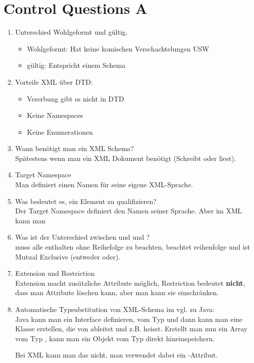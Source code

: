 \section{Control Questions A}
\begin{enumerate}
\item Unterschied Wohlgeformt und gültig.
\begin{itemize}
\item Wohlgeformt: Hat keine komischen Verschachtelungen USW
\item gültig: Entspricht einem Schema
\end{itemize}

\item Vorteile XML über DTD:
\begin{itemize}
\item Vererbung gibt es nicht in DTD
\item Keine Namespaces
\item Keine Enumerationen
\end{itemize}

\item Wann benötigt man ein XML Schema?\\
Spätestens wenn man ein XML Dokument benötigt (Schreibt oder liest).

\item Target Namespace\\
Man definiert einen Namen für seine eigene XML-Sprache.

\item Was bedeutet es, ein Element zu qualifizieren?\\
Der Target Namespace definiert den Namen seiner Sprache. Aber im XML kann man 

\item Was ist der Unterschied zwischen  und  und ?\\
 muss alle enthalten ohne Reihefolge zu beachten,  beachtet reihenfolge und  ist Mutual Exclusive (entweder oder).

\item Extension und Restriction\\
Extension macht zusätzliche Attribute möglich, Restriction bedeutet \textbf{nicht}, dass man Attribute löschen kann, aber man kann sie einschränken.

\item Automatische Typsubstitution von XML-Schema im vgl. zu Java:\\
Java kann man ein Interface definieren, vom Typ  und dann kann man eine Klasse erstellen, die von  ableitet und z.B.  heisst.
Erstellt man nun ein Array vom Typ , kann man ein Objekt vom Typ  direkt hineinspeichern.

Bei XML kann man das nicht, man verwendet dabei ein -Attribut.
\end{enumerate}



